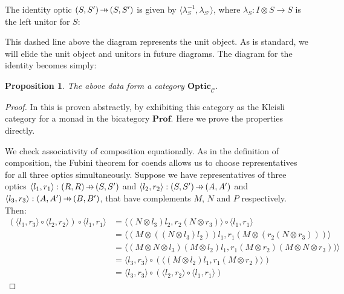 \documentclass[11pt,a4paper]{article}
\theoremstyle{plain}
\newtheorem{proposition}[theorem]{Proposition}
\theoremstyle{definition}
\newcommand{\C}{\mathscr{C}}
\newcommand{\Prof}{\mathbf{Prof}}
\newcommand{\Optic}{\mathbf{Optic}}
\newcommand{\hto}{\ensuremath{\,\mathaccent\shortmid\rightarrow\,}}
\begin{document}
The identity optic $(S, S') \hto (S, S')$ is given by $\langle \lambda^{-1}_S, \lambda_{S'} \rangle$, where $\lambda_S : I \otimes S \to S$ is the left unitor for $S$: 
\begin{center}

\end{center}
This dashed line above the diagram represents the unit object. As is standard, we will elide the unit object and unitors in future diagrams. The diagram for the identity becomes simply:
\begin{center}

\end{center}

\begin{proposition}
The above data form a category $\Optic_\C$.
\end{proposition}
\begin{proof}
In \cite[Section 6]{Doubles} this is proven abstractly, by exhibiting this category as the Kleisli category for a monad in the bicategory $\Prof$. Here we prove the properties directly.

We check associativity of composition equationally. As in the definition of composition, the Fubini theorem for coends allows us to choose representatives for all three optics simultaneously. Suppose we have representatives of three optics $\langle l_1, r_1\rangle : (R, R) \hto (S, S')$ and $\langle l_2, r_2 \rangle : (S, S') \hto (A, A')$ and $\langle l_3, r_3 \rangle : (A, A') \hto (B, B')$, that have complements $M$, $N$ and $P$ respectively. Then:
\begin{align*}
(\langle l_3, r_3 \rangle \circ \langle l_2, r_2 \rangle) \circ \langle l_1, r_1 \rangle 
&= \langle (N \otimes l_3)l_2, r_2(N \otimes r_3) \rangle \circ \langle l_1, r_1 \rangle \\
&= \langle (M \otimes ((N \otimes l_3)l_2))l_1, r_1(M \otimes (r_2(N \otimes r_3))) \rangle \\
&= \langle (M \otimes N \otimes l_3)(M \otimes l_2)l_1, r_1(M \otimes r_2)(M \otimes N \otimes r_3)) \rangle \\
&= \langle l_3, r_3 \rangle \circ (\langle (M \otimes l_2)l_1, r_1(M \otimes r_2) \rangle) \\
&= \langle l_3, r_3 \rangle \circ (\langle l_2, r_2 \rangle \circ \langle l_1, r_1 \rangle)
\end{align*}


\end{proof}
\end{document}
